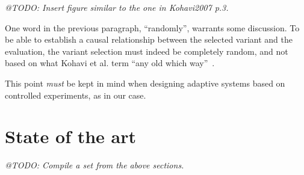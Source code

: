 \emph{@TODO: Insert figure similar to the one in Kohavi2007 p.3.}

One word in the previous paragraph, ``randomly'', warrants some discussion. To be able to establish a causal relationship between the selected variant and the evaluation, the variant selection must indeed be completely random, and not based on what Kohavi et al. term ``any old which way''~\cite{Kohavi2007}.

This point \emph{must} be kept in mind when designing adaptive systems based on controlled experiments, as in our case.

\section{State of the art}
\label{survey:sub:state_of_the_art}

\emph{@TODO: Compile a set from the above sections.}

%
%
%
%
%
